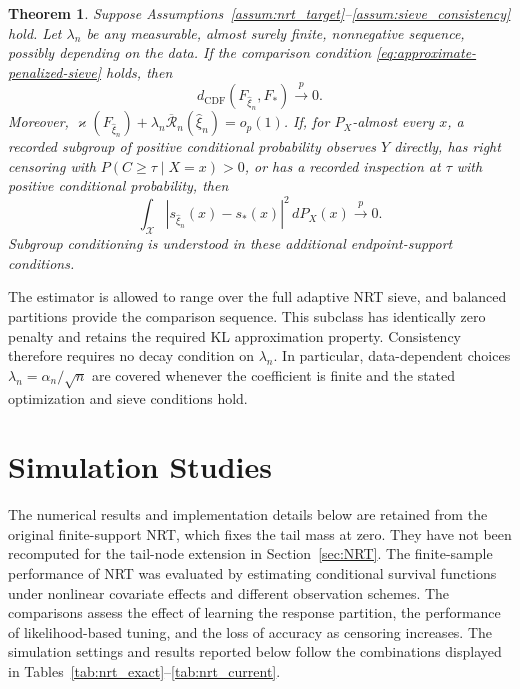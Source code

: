 \documentclass[11pt]{article}
\numberwithin{equation}{section}
\newtheorem{myTheo}{Theorem}
\begin{document}
\begin{myTheo}
\label{thm:nrt_sieve_consistency}
Suppose Assumptions~\ref{assum:nrt_target}--\ref{assum:sieve_consistency} hold. Let $\lambda_n$ be any measurable, almost surely finite, nonnegative sequence, possibly depending on the data. If the comparison condition \eqref{eq:approximate-penalized-sieve} holds, then
\begin{equation}
    d_{\mathrm{CDF}}(F_{\widehat\xi_n},F_*)\xrightarrow{p}0.
    \label{eq:nrt-distributional-consistency}
\end{equation}
Moreover, $\varkappa(F_{\widehat\xi_n})+\lambda_n\overline{\mathcal R}_n(\widehat\xi_n)=o_p(1)$. If, for $P_X$-almost every $x$, a recorded subgroup of positive conditional probability observes $Y$ directly, has right censoring with $P(C\geq\tau\mid X=x)>0$, or has a recorded inspection at $\tau$ with positive conditional probability, then
\[
    \int_{\mathcal X}|s_{\widehat\xi_n}(x)-s_*(x)|^2\,dP_X(x)\xrightarrow{p}0.
\]
Subgroup conditioning is understood in these additional endpoint-support conditions.
\end{myTheo}

The estimator is allowed to range over the full adaptive NRT sieve, and balanced partitions provide the comparison sequence. This subclass has identically zero penalty and retains the required KL approximation property. Consistency therefore requires no decay condition on $\lambda_n$. In particular, data-dependent choices $\lambda_n=\alpha_n/\sqrt n$ are covered whenever the coefficient is finite and the stated optimization and sieve conditions hold.

\section{Simulation Studies}
\label{sec:simulation}

The numerical results and implementation details below are retained from the original finite-support NRT, which fixes the tail mass at zero. They have not been recomputed for the tail-node extension in Section~\ref{sec:NRT}.
The finite-sample performance of NRT was evaluated by estimating conditional survival functions under nonlinear covariate effects and different observation schemes. The comparisons assess the effect of learning the response partition, the performance of likelihood-based tuning, and the loss of accuracy as censoring increases. The simulation settings and results reported below follow the combinations displayed in Tables~\ref{tab:nrt_exact}--\ref{tab:nrt_current}.
\end{document}
